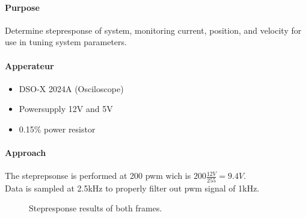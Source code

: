 \documentclass[../../main]{subfiles}
\begin{document}
\paragraph{Purpose}%
\label{par:purpose}

Determine stepresponse of system, monitoring current, position, and velocity for use in tuning system parameters.

\paragraph{Apperateur}%
\label{par:apperateur}
\begin{itemize}
	\item DSO-X 2024A (Osciloscope)
	\item Powersupply 12\si{V} and 5\si{V}
	\item 0.1\si{\Omega}5\% power resistor
\end{itemize}


\paragraph{Approach}%
\label{par:approach}
The steprepsonse is performed at 200 pwm wich is $200\frac{12\si{V}}{255} = 9.4\si{V}$.\\
Data is sampled at 2.5\si{kHz} to properly filter out pwm signal of 1\si{kHz}.


\begin{figure}[H]
        \centering
				\def\svgwidth{0.47\columnwidth}
				\def\svgwidth{0.47\columnwidth}
				\caption{Stepresponse results of both frames.}
				\label{fig:jour_step_bot}
\end{figure}
\end{document}
